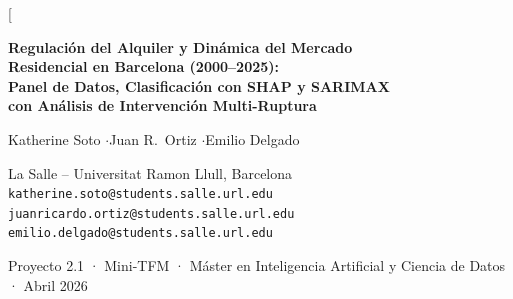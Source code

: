 \documentclass[10pt,a4paper,twocolumn]{article}
\begin{document}

\twocolumn[{%
\begin{@twocolumnfalse}
\begin{center}
  {\LARGE\bfseries
   Regulación del Alquiler y Dinámica del Mercado\\[4pt]
   Residencial en Barcelona (2000--2025):\\[4pt]
   Panel de Datos, Clasificación con SHAP y SARIMAX\\[4pt]
   con Análisis de Intervención Multi-Ruptura}

  \vspace{8pt}
  {\large Katherine Soto \quad$\cdot$\quad Juan R.\ Ortiz \quad$\cdot$\quad Emilio Delgado}

  \vspace{3pt}
  {\normalsize La Salle -- Universitat Ramon Llull, Barcelona}\\[2pt]
  {\small \texttt{katherine.soto@students.salle.url.edu} \quad
          \texttt{juanricardo.ortiz@students.salle.url.edu} \quad
          \texttt{emilio.delgado@students.salle.url.edu}}

  \vspace{3pt}
  {\small Proyecto 2.1 · Mini-TFM · Máster en Inteligencia Artificial y Ciencia de Datos · Abril 2026}
\end{center}

\vspace{6pt}

\begin{abstract}
\noindent
Presentamos un análisis cuantitativo multimétodo del mercado de alquiler residencial de Barcelona
durante tres ciclos regulatorios sucesivos: Ley~11/2020, derogación del Tribunal Constitucional
(2022) y Ley~12/2023. Los datos provienen de Incasol -- Generalitat de Catalunya
(10~distritos, 2000Q1--2025Q3; 66~barrios, 2014Q1--2025Q3), el IPC del INE (base~2025),
el Euríbor del Banco de España y el Índice Socioeconómico Territorial de Idescat.
Empleamos cuatro módulos complementarios:
\textit{(i)}~regresión de panel con efectos fijos y términos de interacción de heterogeneidad
(\textit{within}, $N{=}2.838$, barrios $\times$ trimestres); \textit{(ii)}~clasificación supervisada con ingeniería de
características por retardos temporales y explicabilidad via valores SHAP;
\textit{(iii)}~modelos SARIMAX$(1,1,1)(1,0,1)_4$ con búsqueda en rejilla AIC/BIC,
test ARCH-LM de heterocedasticidad y análisis ITS-3 sobre 30 combinaciones
distrito$\times$métrica; y \textit{(iv)}~análisis de sensibilidad al sesgo de sustitución
hacia contratos de temporada. Con lag features, el AUC del Random Forest sube de 0.553 a
\textbf{0.684}, y la validación cruzada temporal confirma 0.684\,$\pm$\,0.083.
Los valores SHAP identifican el retardo-4 del crecimiento de contratos como señal dominante
de tensión. El ITS-3 muestra que la Ley~12/2023 contrae contratos
($\hat\beta_{D_{12}}{=}{-}1.588$, $p{=}0.007$) pero eleva el precio real
($+0.495$\,\euro/m$^2$, $p{=}0.034$), evidencia del efecto composición.
El punto de indiferencia del análisis de sustitución sitúa la tasa crítica de migración
a temporada en el $20.3$\,\% del volumen.
\end{abstract}


\end{@twocolumnfalse}}
\end{document}
